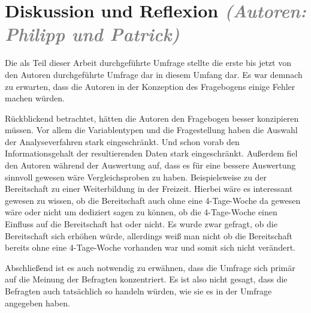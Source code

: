 \chapter{Diskussion und Reflexion \textit{\textcolor{gray}{(Autoren: Philipp und Patrick)}}}


Die als Teil dieser Arbeit durchgeführte Umfrage stellte die erste bis jetzt von den Autoren durchgeführte
Umfrage dar in diesem Umfang dar. Es war demnach zu erwarten, dass die Autoren in der Konzeption des Fragebogens
einige Fehler machen würden. 

Rückblickend betrachtet, hätten die Autoren den Fragebogen besser konzipieren müssen.
Vor allem die Variablentypen und die Fragestellung haben die Auswahl der Analyseverfahren stark eingeschränkt. Und schon
vorab den Informationsgehalt der resultierenden Daten stark eingeschränkt.
Außerdem fiel den Autoren während der Auswertung auf, dass es für eine bessere Auswertung sinnvoll gewesen wäre 
Vergleichsproben zu haben. Beispielsweise zu der Bereitschaft zu einer Weiterbildung in der Freizeit. 
Hierbei wäre es interessant gewesen zu wissen, ob die Bereitschaft auch ohne eine 4-Tage-Woche da gewesen 
wäre oder nicht um dediziert sagen zu können, ob die 4-Tage-Woche einen Einfluss auf die Bereitschaft hat oder nicht.
Es wurde zwar gefragt, ob die Bereitschaft sich erhöhen würde, allerdings weiß man nicht
ob die Bereitschaft bereits ohne eine 4-Tage-Woche vorhanden war und somit sich nicht verändert.

Abschließend ist es auch notwendig zu erwähnen, dass die Umfrage sich primär auf die Meinung der Befragten konzentriert.
Es ist also nicht gesagt, dass die Befragten auch tatsächlich so handeln würden, wie sie es in der Umfrage angegeben haben.


